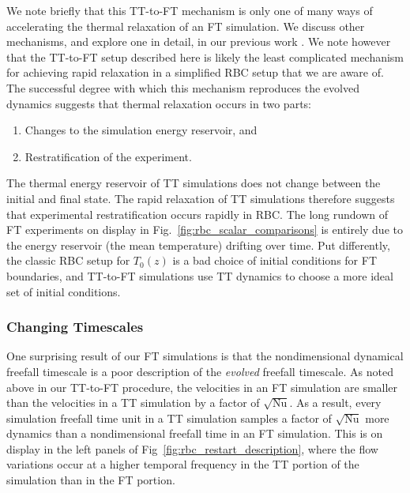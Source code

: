 \documentclass[aps, pre, onecolumn, nofootinbib, notitlepage, groupedaddress, amsfonts, amssymb, amsmath, longbibliography, superscriptaddress]{revtex4-1}
\begin{document}
We note briefly that this TT-to-FT mechanism is only one of many ways of accelerating the thermal relaxation of an FT simulation.
We discuss other mechanisms, and explore one in detail, in our previous work \cite{anders&all2018}.
We note however that the TT-to-FT setup described here is likely the least complicated mechanism for achieving rapid relaxation in a simplified RBC setup that we are aware of.
The successful degree with which this mechanism reproduces the evolved dynamics suggests that thermal relaxation occurs in two parts:
\begin{enumerate}
\item Changes to the simulation energy reservoir, and
\item Restratification of the experiment.
\end{enumerate}
The thermal energy reservoir of TT simulations does not change between the initial and final state.
The rapid relaxation of TT simulations therefore suggests that experimental restratification occurs rapidly in RBC. 
The long rundown of FT experiments on display in Fig.~\ref{fig:rbc_scalar_comparisons} is entirely due to the energy reservoir (the mean temperature) drifting over time.
Put differently, the classic RBC setup for $T_0(z)$ is a bad choice of initial conditions for FT boundaries, and TT-to-FT simulations use TT dynamics to choose a more ideal set of initial conditions.


\subsubsection{Changing Timescales}
\label{sec:timescales}
One surprising result of our FT simulations is that the nondimensional dynamical freefall timescale is a poor description of the \emph{evolved} freefall timescale.
As noted above in our TT-to-FT procedure, the velocities in an FT simulation are smaller than the velocities in a TT simulation by a factor of $\sqrt{\text{Nu}}$.
As a result, every simulation freefall time unit in a TT simulation samples a factor of $\sqrt{\text{Nu}}$ more dynamics than a nondimensional freefall time in an FT simulation.
This is on display in the left panels of Fig~\ref{fig:rbc_restart_description}, where the flow variations occur at a higher temporal frequency in the TT portion of the simulation than in the FT portion.
\end{document}
